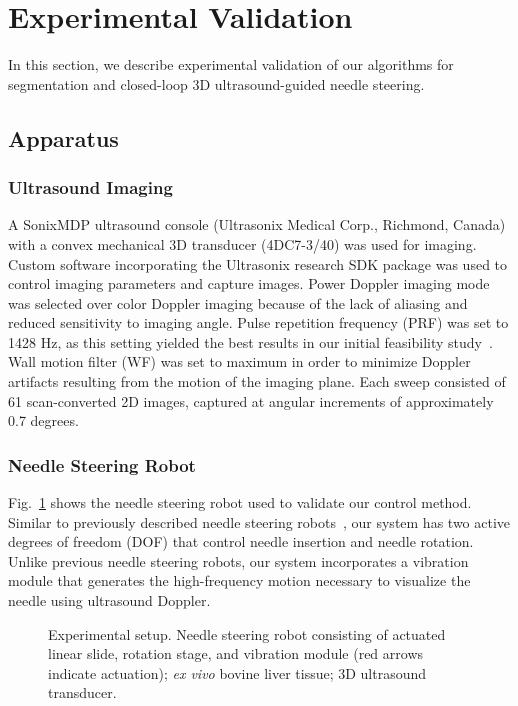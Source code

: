 \section{Experimental Validation}
\label{sec:ExperimentalValidation}
In this section, we describe experimental validation of our algorithms for segmentation and closed-loop 3D ultrasound-guided needle steering.
\subsection{Apparatus}
\subsubsection{Ultrasound Imaging}
A SonixMDP ultrasound console (Ultrasonix Medical Corp., Richmond, Canada) with a convex mechanical 3D transducer (4DC7-3/40) was used for imaging. Custom software incorporating the Ultrasonix research SDK package was used to control imaging parameters and capture images. Power Doppler imaging mode was selected over color Doppler imaging because of the lack of aliasing and reduced sensitivity to imaging angle. Pulse repetition frequency (PRF) was set to 1428 Hz, as this setting yielded the best results in our initial feasibility study~\cite{Adebar2013}. Wall motion filter (WF) was set to maximum in order to minimize Doppler artifacts resulting from the motion of the imaging plane. Each sweep consisted of 61 scan-converted 2D images, captured at angular increments of approximately 0.7 degrees.

\subsubsection{Needle Steering Robot}
Fig.~\ref{fig:ExperimentalSetup} shows the needle steering robot used to validate our control method. Similar to previously described needle steering robots~\cite{Webster2005}, our system has two active degrees of freedom (DOF) that control needle insertion and needle rotation. Unlike previous needle steering robots, our system incorporates a vibration module that generates the high-frequency motion necessary to visualize the needle using ultrasound Doppler.

\begin{figure}[!t]
\caption[Experimental setup]{Experimental setup. Needle steering robot consisting of actuated linear slide, rotation stage, and vibration module (red arrows indicate actuation); \textit{ex vivo} bovine liver tissue; 3D ultrasound transducer.}
\label{fig:ExperimentalSetup}
\end{figure}

